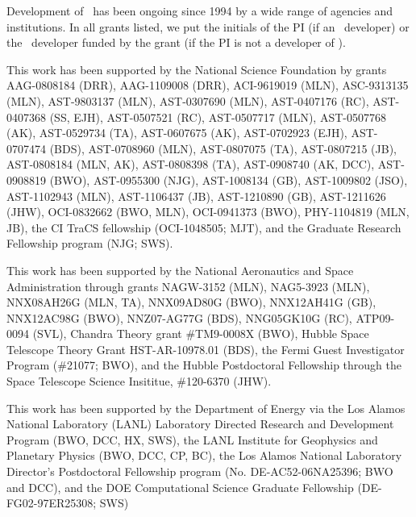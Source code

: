 
\acknowledgments

Development of \enzo\ has been ongoing since 1994 by a wide range of
agencies and institutions.  In all grants listed, we put the
initials of the PI (if an \enzo\ developer) or the \enzo\ developer
funded by the grant (if the PI is not a developer of \enzo).

This work has been supported by the National Science Foundation by
grants
AAG-0808184 (DRR),
AAG-1109008 (DRR),
ACI-9619019 (MLN),
ASC-9313135 (MLN),
AST-9803137 (MLN), 
AST-0307690 (MLN), 
AST-0407176 (RC),
AST-0407368 (SS, EJH),
AST-0507521 (RC), 
AST-0507717 (MLN), 
AST-0507768 (AK),
AST-0529734 (TA),
AST-0607675 (AK),
AST-0702923 (EJH),
AST-0707474 (BDS), 
AST-0708960 (MLN), 
AST-0807075 (TA),
AST-0807215 (JB),
AST-0808184 (MLN, AK),
AST-0808398 (TA),
AST-0908740 (AK, DCC),
AST-0908819 (BWO), 
AST-0955300 (NJG),
AST-1008134 (GB), 
AST-1009802 (JSO), 
AST-1102943 (MLN),
AST-1106437 (JB),
AST-1210890 (GB),
AST-1211626 (JHW),
OCI-0832662 (BWO, MLN),
OCI-0941373 (BWO),
PHY-1104819 (MLN, JB),
the CI TraCS fellowship (OCI-1048505; MJT),
and the Graduate Research Fellowship program (NJG; SWS).

This work has been supported by the National Aeronautics and Space
Administration through grants
NAGW-3152 (MLN),
NAG5-3923 (MLN),
NNX08AH26G (MLN, TA),
NNX09AD80G (BWO),
NNX12AH41G (GB),
NNX12AC98G (BWO),
NNZ07-AG77G (BDS),
NNG05GK10G (RC),
ATP09-0094 (SVL),
Chandra Theory grant \#TM9-0008X (BWO),
Hubble Space Telescope Theory Grant HST-AR-10978.01 (BDS),
the Fermi Guest Investigator Program (\#21077; BWO),
and the Hubble Postdoctoral Fellowship through the Space Telescope Science
Insititue, \#120-6370 (JHW).

This work has been supported by the Department of Energy via the
Los Alamos National Laboratory (LANL) Laboratory Directed Research and
Development Program (BWO, DCC, HX, SWS), 
the LANL Institute for Geophysics and Planetary Physics (BWO, DCC, CP,
BC),
the Los Alamos National Laboratory Director's Postdoctoral Fellowship
program (No. DE-AC52-06NA25396;
BWO and DCC), and the
DOE Computational Science Graduate Fellowship (DE-FG02-97ER25308; SWS)

